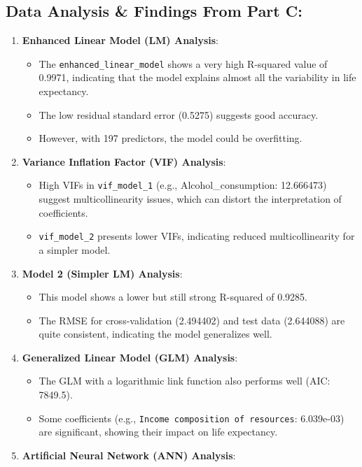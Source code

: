 \documentclass[
]{article}
\providecommand{\tightlist}{%
  \setlength{\itemsep}{0pt}\setlength{\parskip}{0pt}}
\begin{document}
\hypertarget{data-analysis-findings-from-part-c}{%
\subsection{Data Analysis \& Findings From Part
C:}\label{data-analysis-findings-from-part-c}}

\begin{enumerate}
\def\labelenumi{\arabic{enumi}.}
\tightlist
\item
  \textbf{Enhanced Linear Model (LM) Analysis}:

  \begin{itemize}
  \tightlist
  \item
    The \texttt{enhanced\_linear\_model} shows a very high R-squared
    value of 0.9971, indicating that the model explains almost all the
    variability in life expectancy.
  \item
    The low residual standard error (0.5275) suggests good accuracy.
  \item
    However, with 197 predictors, the model could be overfitting.
  \end{itemize}
\item
  \textbf{Variance Inflation Factor (VIF) Analysis}:

  \begin{itemize}
  \tightlist
  \item
    High VIFs in \texttt{vif\_model\_1} (e.g., Alcohol\_consumption:
    12.666473) suggest multicollinearity issues, which can distort the
    interpretation of coefficients.
  \item
    \texttt{vif\_model\_2} presents lower VIFs, indicating reduced
    multicollinearity for a simpler model.
  \end{itemize}
\item
  \textbf{Model 2 (Simpler LM) Analysis}:

  \begin{itemize}
  \tightlist
  \item
    This model shows a lower but still strong R-squared of 0.9285.
  \item
    The RMSE for cross-validation (2.494402) and test data (2.644088)
    are quite consistent, indicating the model generalizes well.
  \end{itemize}
\item
  \textbf{Generalized Linear Model (GLM) Analysis}:

  \begin{itemize}
  \tightlist
  \item
    The GLM with a logarithmic link function also performs well (AIC:
    7849.5).
  \item
    Some coefficients (e.g.,
    \texttt{Income\ composition\ of\ resources}: 6.039e-03) are
    significant, showing their impact on life expectancy.
  \end{itemize}
\item
  \textbf{Artificial Neural Network (ANN) Analysis}:


\end{enumerate}
\end{document}
